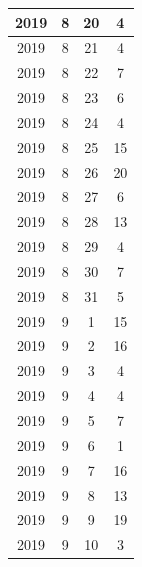 \begin{longtable} {|c|c|c|c|}
\hline
2019         & 8            & 20           & 4                         \\ 
\hline
2019         & 8            & 21           & 4                         \\ 
\hline
2019         & 8            & 22           & 7                         \\ 
\hline
2019         & 8            & 23           & 6                         \\ 
\hline
2019         & 8            & 24           & 4                         \\ 
\hline
2019         & 8            & 25           & 15                        \\ 
\hline
2019         & 8            & 26           & 20                        \\ 
\hline
2019         & 8            & 27           & 6                         \\ 
\hline
2019         & 8            & 28           & 13                        \\ 
\hline
2019         & 8            & 29           & 4                         \\ 
\hline
2019         & 8            & 30           & 7                         \\ 
\hline
2019         & 8            & 31           & 5                         \\ 
\hline
2019         & 9            & 1            & 15                        \\ 
\hline
2019         & 9            & 2            & 16                        \\ 
\hline
2019         & 9            & 3            & 4                         \\ 
\hline
2019         & 9            & 4            & 4                         \\ 
\hline
2019         & 9            & 5            & 7                         \\ 
\hline
2019         & 9            & 6            & 1                         \\ 
\hline
2019         & 9            & 7            & 16                        \\ 
\hline
2019         & 9            & 8            & 13                        \\ 
\hline
2019         & 9            & 9            & 19                        \\ 
\hline
2019         & 9            & 10           & 3                         \\ 

\end{longtable}
